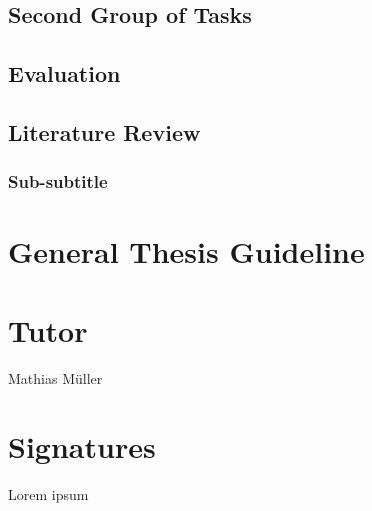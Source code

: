 \documentclass[english]{uzhpub}
\begin{document}
\subsection{Second Group of Tasks}
\subsection{Evaluation}
\subsection{Literature Review}

\subsubsection{Sub-subtitle}


\section{General Thesis Guideline}


\section{Tutor}
Mathias M\"uller

\section{Signatures}
Lorem ipsum



\end{document}

